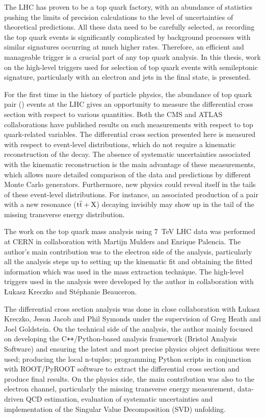The LHC has proven to be a top quark factory, with an abundance of statistics pushing the limits of precision
calculations to the level of uncertainties of theoretical predictions. All these data need to be carefully selected, as
recording the top quark events is significantly complicated by background processes with similar signatures occurring at
much higher rates. Therefore, an efficient and manageable trigger is a crucial part of any top quark analysis. In this
thesis, work on the high-level triggers used for selection of top quark events with semileptonic signature, particularly
with an electron and jets in the final state, is presented.

For the first time in the history of particle physics, the abundance of top quark pair (\ttbar) events at the LHC gives
an opportunity to measure the \ttbar differential cross section with respect to various quantities. Both the CMS and
ATLAS collaborations have published results on such measurements with respect to top quark-related variables. The \ttbar
differential cross section presented here is measured with respect to event-level distributions, which do not require a
kinematic reconstruction of the \ttbar decay. The absence of systematic uncertainties associated with the kinematic
reconstruction is the main advantage of these measurements, which allows more detailed comparison of the data and
predictions by different Monte Carlo generators. Furthermore, new physics could reveal itself in the tails of these
event-level distributions. For instance, an associated production of a \ttbar pair with a new resonance
($\mathrm{t}\overline{\mathrm{t}}+\mathrm{X}$) decaying invisibly may show up in the tail of the missing transverse energy distribution.

The work on the top quark mass analysis using \SI{7}{\TeV} LHC data was performed at CERN in collaboration with Martijn
Mulders and Enrique Palencia. The author's main contribution was to the electron side of the analysis, particularly all
the analysis steps up to setting up the kinematic fit and obtaining the fitted information which was used in the mass
extraction technique. The high-level triggers used in the analysis were developed by the author in collaboration with
\L{}ukasz Kreczko and St\'{e}phanie Beauceron.

The differential cross section analysis was done in close collaboration with \L{}ukasz Kreczko, Jeson Jacob and Phil
Symonds under the supervision of Greg Heath and Joel Goldstein. On the technical side of the analysis, the author mainly
focused on developing the C\texttt{++}/Python-based analysis framework (Bristol Analysis Software) and ensuring the
latest and most precise physics object definitions were used; producing the local n-tuples; programming Python scripts
in conjunction with ROOT/PyROOT software to extract the differential cross section and produce final results. On the
physics side, the main contribution was also to the electron channel, particularly the missing transverse energy
measurement, data-driven QCD estimation, evaluation of systematic uncertainties and implementation of the Singular Value
Decomposition (SVD) unfolding.

